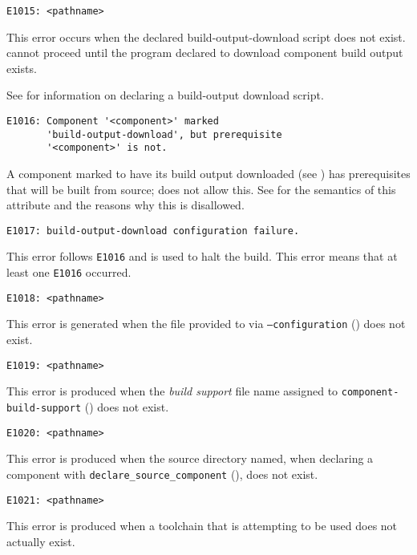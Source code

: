\begin{verbatim}
E1015: <pathname>
\end{verbatim}

This error occurs when the declared build-output-download script does
not exist.  \lmsbw cannot proceed until the program declared to
download component build output exists.

See  for
information on declaring a build-output download script.


\begin{verbatim}
E1016: Component '<component>' marked
       'build-output-download', but prerequisite
       '<component>' is not.
\end{verbatim}

A component marked to have its build output downloaded (see
) has prerequisites that will be built
from source; \lmsbw does not allow this.  See
 for the semantics of this
attribute and the reasons why this is disallowed.


\begin{verbatim}
E1017: build-output-download configuration failure.
\end{verbatim}

This error follows \texttt{E1016} and is used to halt the build.  This
error means that at least one \texttt{E1016} occurred.


\begin{verbatim}
E1018: <pathname>
\end{verbatim}

This error is generated when the file provided to via
\texttt{--configuration} () does not
exist.


\begin{verbatim}
E1019: <pathname>
\end{verbatim}

This error is produced when the \emph{build support} file name
assigned to \texttt{component-build-support}
() does not exist.


\begin{verbatim}
E1020: <pathname>
\end{verbatim}

This error is produced when the source directory named, when declaring
a component with \texttt{declare\_source\_component}
(), does not exist.


\begin{verbatim}
E1021: <pathname>
\end{verbatim}

This error is produced when a toolchain that is attempting to be used
does not actually exist.
